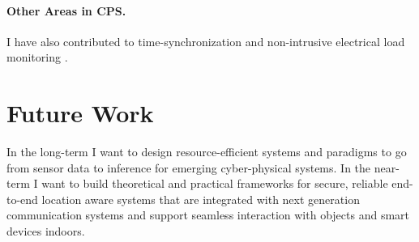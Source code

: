 \documentclass[10pt]{article}
\begin{document}
\paragraph{Other Areas in CPS. }
I have also contributed to time-synchronization \cite{buevich2013hardware, dongare2017pulsar} and non-intrusive electrical load
monitoring \cite{rajagopal2013magnetic, rajagopal2013demo}.

\section{Future Work}
In the long-term I want to design resource-efficient systems and paradigms to go from sensor data to inference for emerging cyber-physical systems.
In the near-term I want to build theoretical and practical frameworks for secure, reliable end-to-end location aware systems that are integrated with next generation communication systems and support seamless interaction with objects and smart devices indoors. 
\end{document}
